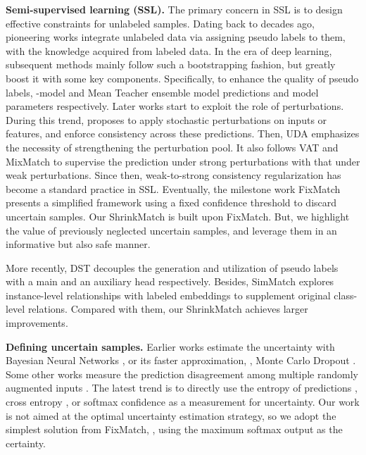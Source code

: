 \documentclass[10pt,twocolumn,letterpaper]{article}
\begin{document}
\noindent
\textbf{Semi-supervised learning (SSL).} The primary concern in SSL \cite{pseudolabel, fixmatch, dash, comatch, meta, conmatch, yang2022class, noisystudent, s4l, lassl, simple, overviewssl, taherkhani2021self, nassar2021all, cai2022semi, tang2022towards, fan2022cossl, wang2022unsupervised, assran2021semi, flexmatch} is to design effective constraints for unlabeled samples. Dating back to decades ago, pioneering works \cite{pseudolabel, selftraining} integrate unlabeled data via assigning pseudo labels to them, with the knowledge acquired from labeled data. In the era of deep learning, subsequent methods mainly follow such a bootstrapping fashion, but greatly boost it with some key components. Specifically, to enhance the quality of pseudo labels, -model \cite{pimodel} and Mean Teacher \cite{meanteacher} ensemble model predictions and model parameters respectively. Later works start to exploit the role of perturbations. During this trend, \cite{sajjadi2016regularization} proposes to apply stochastic perturbations on inputs or features, and enforce consistency across these predictions. Then, UDA \cite{uda} emphasizes the necessity of strengthening the perturbation pool. It also follows VAT \cite{vat} and MixMatch \cite{mixmatch} to supervise the prediction under strong perturbations with that under weak perturbations. Since then, weak-to-strong consistency regularization has become a standard practice in SSL. Eventually, the milestone work FixMatch \cite{fixmatch} presents a simplified framework using a fixed confidence threshold to discard uncertain samples. Our ShrinkMatch is built upon FixMatch. But, we highlight the value of previously neglected uncertain samples, and leverage them in an informative but also safe manner.

More recently, DST \cite{debiased} decouples the generation and utilization of pseudo labels with a main and an auxiliary head respectively. Besides, SimMatch \cite{simmatch} explores instance-level relationships with labeled embeddings to supplement original class-level relations. Compared with them, our ShrinkMatch achieves larger improvements.

\vspace{2mm}
\noindent
\textbf{Defining uncertain samples.} Earlier works estimate the uncertainty with Bayesian Neural Networks \cite{kendall2017uncertainties}, or its faster approximation, \eg, Monte Carlo Dropout \cite{dropout}. Some other works measure the prediction disagreement among multiple randomly augmented inputs \cite{wang2019aleatoric}. The latest trend is to directly use the entropy of predictions \cite{uamt}, cross entropy \cite{dash}, or softmax confidence \cite{fixmatch} as a measurement for uncertainty. Our work is not aimed at the optimal uncertainty estimation strategy, so we adopt the simplest solution from FixMatch, \ie, using the maximum softmax output as the certainty. 
\end{document}
